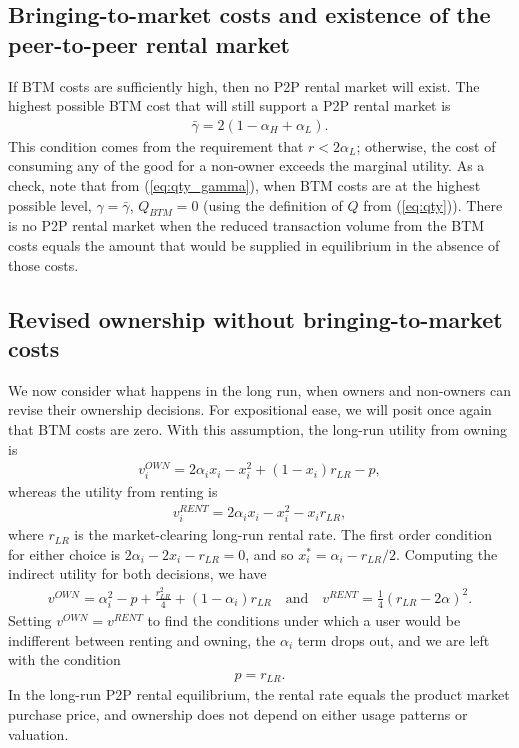 \documentclass[11pt]{article}
\begin{document}
\subsection{Bringing-to-market costs and existence of the peer-to-peer rental market}
If BTM costs are sufficiently high, then no P2P rental market will exist. 
The highest possible BTM cost that will still support a P2P rental market is 
\begin{align} 
  \bar{\gamma} = 2(1-\alpha_H + \alpha_L). 
\end{align}
This condition comes from the requirement that  $r < 2 \alpha_L$; otherwise, the cost of consuming any of the good for a non-owner exceeds the marginal utility. 
As a check, note that from (\ref{eq:qty_gamma}), when BTM costs are at the highest possible level, $\gamma = \bar{\gamma}$, $Q_{BTM} = 0$ (using the definition of $Q$ from (\ref{eq:qty})).
There is no P2P rental market when the reduced transaction volume from the BTM costs equals the amount that would be supplied in equilibrium in the absence of those costs. 

%  

\subsection{Revised ownership without bringing-to-market costs}
We now consider what happens in the long run, when owners and non-owners can revise their ownership decisions.
For expositional ease, we will posit once again that BTM costs are zero. 
With this assumption, the long-run utility from owning is 
\begin{align}
v^{OWN}_i = 2\alpha_i x_i - x_i^2 + (1-x_i)r_{LR} - p,   
\end{align} 
whereas the utility from renting is 
\begin{align}
v^{RENT}_{i} = 2\alpha_i x_i - x_i^2 - x_i r_{LR}, 
\end{align} 
where $r_{LR}$ is the market-clearing long-run rental rate. 
The first order condition for either choice is $2 \alpha_i - 2 x_i - r_{LR} = 0$, and so $x^*_i = \alpha_i - r_{LR}/2$. 
Computing the indirect utility for both decisions, we have
\begin{align} 
v^{OWN} = \alpha_i^2 - p + \frac{r_{LR}^2}{4} + (1 - \alpha_i) r_{LR} \quad  \mbox{and} \quad v^{RENT} = \frac{1}{4} (r_{LR}- 2\alpha )^2. 
\end{align} 
Setting $v^{OWN} = v^{RENT}$ to find the conditions under which a user would be indifferent between renting and owning, the $\alpha_i$ term drops out, and we are left with the condition 
\begin{align} \label{eq:lr_eq_r}
p = r_{LR}. 
\end{align}
In the long-run P2P rental equilibrium, the rental rate equals the product market purchase price, and ownership does not depend on either usage patterns or valuation.  
\end{document}
